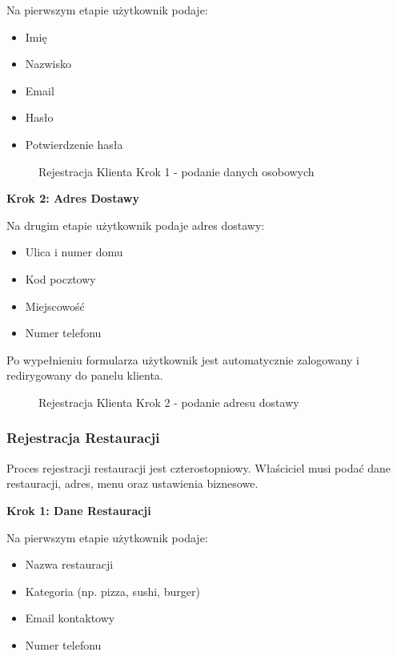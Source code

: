 \documentclass[12pt,a4paper,utf-8]{article}
\begin{document}
Na pierwszym etapie użytkownik podaje:
\begin{itemize}
    \item Imię
    \item Nazwisko
    \item Email
    \item Hasło
    \item Potwierdzenie hasła
\end{itemize}

\begin{figure}[H]
    \centering
    \caption{Rejestracja Klienta Krok 1  -  podanie danych osobowych}
    \label{fig:client_registration_1}
\end{figure}

\textbf{Krok 2: Adres Dostawy}

Na drugim etapie użytkownik podaje adres dostawy:
\begin{itemize}
    \item Ulica i numer domu
    \item Kod pocztowy
    \item Miejscowość
    \item Numer telefonu
\end{itemize}

Po wypełnieniu formularza użytkownik jest automatycznie zalogowany i redirygowany do panelu klienta.

\begin{figure}[H]
    \centering
    \caption{Rejestracja Klienta Krok 2  -  podanie adresu dostawy}
    \label{fig:client_registration_2}
\end{figure}

\subsubsection{Rejestracja Restauracji}

Proces rejestracji restauracji jest czterostopniowy. Właściciel musi podać dane restauracji, adres, menu oraz ustawienia biznesowe.

\textbf{Krok 1: Dane Restauracji}

Na pierwszym etapie użytkownik podaje:
\begin{itemize}
    \item Nazwa restauracji
    \item Kategoria (np. pizza, sushi, burger)
    \item Email kontaktowy
    \item Numer telefonu
\end{itemize}
\end{document}
